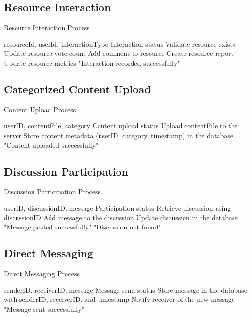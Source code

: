 \subsection{Resource Interaction}
\begin{algorithm}[H]
\caption{Resource Interaction Process}\label{alg:resource_interaction}
\begin{algorithmic}[1]
\Require resourceId, userId, interactionType
\Ensure Interaction status
\State Validate resource exists
    \State Update resource vote count
    \State Add comment to resource
    \State Create resource report
\EndIf
\State Update resource metrics
\State \Return "Interaction recorded successfully"
\end{algorithmic}
\end{algorithm}

\subsection{Categorized Content Upload}
\begin{algorithm}[H]
\caption{Content Upload Process}\label{alg:content_upload}
\begin{algorithmic}[1]
\Require userID, contentFile, category
\Ensure Content upload status
\State Upload contentFile to the server
\State Store content metadata (userID, category, timestamp) in the database
\State \Return "Content uploaded successfully"
\end{algorithmic}
\end{algorithm}

\subsection{Discussion Participation}
\begin{algorithm}[H]
\caption{Discussion Participation Process}\label{alg:discussion}
\begin{algorithmic}[1]
\Require userID, discussionID, message
\Ensure Participation status
\State Retrieve discussion using discussionID
    \State Add message to the discussion
    \State Update discussion in the database
    \State \Return "Message posted successfully"
\Else
    \State \Return "Discussion not found"
\EndIf
\end{algorithmic}
\end{algorithm}

\subsection{Direct Messaging}
\begin{algorithm}[H]
\caption{Direct Messaging Process}\label{alg:messaging}
\begin{algorithmic}[1]
\Require senderID, receiverID, message
\Ensure Message send status
\State Store message in the database with senderID, receiverID, and timestamp
\State Notify receiver of the new message
\State \Return "Message sent successfully"
\end{algorithmic}
\end{algorithm}

